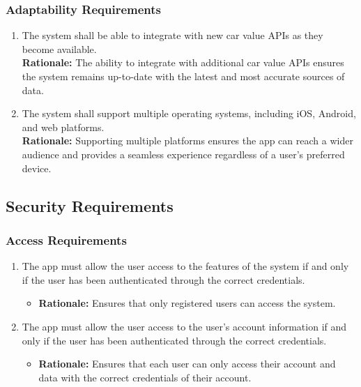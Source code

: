 \documentclass[]{article}
\begin{document}
\subsubsection{Adaptability Requirements}
\label{ssub:adaptability_requirements}
\begin{enumerate}[{MS-A}1. ]
\item The system shall be able to integrate with new car value APIs as they become available.\\
\textbf{Rationale:} The ability to integrate with additional car value APIs ensures the system remains up-to-date with the latest and most accurate sources of data.
\item The system shall support multiple operating systems, including iOS, Android, and web platforms.\\
\textbf{Rationale:} Supporting multiple platforms ensures the app can reach a wider audience and provides a seamless experience regardless of a user's preferred device.
\end{enumerate}

\subsection{Security Requirements}
\label{sub:security_requirements}

\subsubsection{Access Requirements}
\label{ssub:access_requirements}
\begin{enumerate}[{SR-AC}1. ]
\item The app must allow the user access to the features of the system if and only if the user has been authenticated through the correct credentials.
    \begin{itemize}
        \item \textbf{Rationale:} Ensures that only registered users can access the system.
    \end{itemize}

\item The app must allow the user access to the user's account information if and only if the user has been authenticated through the correct credentials.
    \begin{itemize}
        \item \textbf{Rationale:} Ensures that each user can only access their account and data with the correct credentials of their account.
    \end{itemize}
\end{enumerate}
\end{document}
